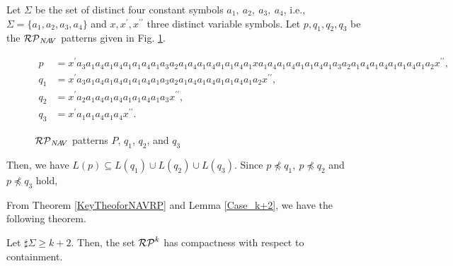 \begin{ex}\label{Case_k+1}\label{反例k+1}
Let $\Sigma$ be the set of distinct four constant symbols $a_{1},~a_{2},~a_{3},~a_{4}$, i.e., $\Sigma= \{a_{1}, a_{2}, a_{3}, a_{4} \}$ and $x,x^{\prime},x^{\prime\prime}$ three distinct variable symbols.
Let $p,q_{1},q_{2},q_{3}$ be the $\mathcal{RP}_{N\!A\!V}$ patterns given in Fig. \ref{Fig:CounterExampleforNAVR}. 
\begin{figure*}[tb]
\begin{align*}
p & = x^{\prime}a_{3}a_{1}a_{4}a_{1}a_{4}a_{1}a_{1}a_{4}a_{1}a_{3}a_{2}a_{1}a_{4}a_{1}a_{4}a_{1}a_{1}a_{4}a_{1}xa_{1}a_{4}a_{1}a_{4}a_{1}a_{1}a_{4}a_{1}a_{3}a_{2}a_{1}a_{4}a_{1}a_{4}a_{1}a_{1}a_{4}a_{1}a_{2}x^{\prime\prime},\\
q_{1} & = x^{\prime}a_{3}a_{1}a_{4}a_{1}a_{4}a_{1}a_{1}a_{4}a_{1}a_{3}a_{2}a_{1}a_{4}a_{1}a_{4}a_{1}a_{1}a_{4}a_{1}a_{2}x^{\prime\prime},\\
q_{2} & = x^{\prime}a_{2}a_{1}a_{4}a_{1}a_{4}a_{1}a_{1}a_{4}a_{1}a_{3}x^{\prime\prime},\\
q_{3} & = x^{\prime}a_{1}a_{1}a_{4}a_{1}a_{4}x^{\prime\prime}.
\end{align*}
\caption{$\mathcal{RP}_{N\!A\!V}$ patterns $P$, $q_{1}$, $q_{2}$, and $q_{3}$}\label{Fig:CounterExampleforNAVR}
\end{figure*}
\noindent
Then, we have $L(p) \subseteq L(q_{1}) \cup L(q_{2}) \cup L(q_{3})$.
Since $p \not \preceq q_{1},~p \not \preceq q_{2}$ and $p \not \preceq q_{3}$ hold,


\end{ex}

From Theorem \ref{KeyTheoforNAVRP} and Lemma \ref{Case_k+2}, we have the following theorem.

\begin{thm}\label{MainTheforNAVRP}
Let $\sharp\Sigma \ge k+2$.
Then, the set $\mathcal{RP}^{k}$ has compactness with respect to containment.
\end{thm}